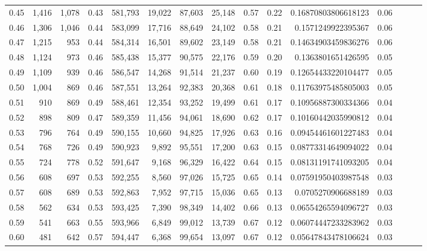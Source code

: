 \begin{tabular}{rrrrrrrrrrrrrrr}
0.45 &   1,416 &  1,078 &  0.43 &  581,793 &   19,022 &   87,603 &   25,148 &  0.57 &  0.22 &     0.16870803806618123 &      0.06 \\
0.46 &   1,306 &  1,046 &  0.44 &  583,099 &   17,716 &   88,649 &   24,102 &  0.58 &  0.21 &      0.1571249922395367 &      0.06 \\
0.47 &   1,215 &    953 &  0.44 &  584,314 &   16,501 &   89,602 &   23,149 &  0.58 &  0.21 &     0.14634903459836276 &      0.06 \\
0.48 &   1,124 &    973 &  0.46 &  585,438 &   15,377 &   90,575 &   22,176 &  0.59 &  0.20 &      0.1363801651426595 &      0.05 \\
0.49 &   1,109 &    939 &  0.46 &  586,547 &   14,268 &   91,514 &   21,237 &  0.60 &  0.19 &     0.12654433220104477 &      0.05 \\
0.50 &   1,004 &    869 &  0.46 &  587,551 &   13,264 &   92,383 &   20,368 &  0.61 &  0.18 &     0.11763975485805003 &      0.05 \\
0.51 &     910 &    869 &  0.49 &  588,461 &   12,354 &   93,252 &   19,499 &  0.61 &  0.17 &     0.10956887300334366 &      0.04 \\
0.52 &     898 &    809 &  0.47 &  589,359 &   11,456 &   94,061 &   18,690 &  0.62 &  0.17 &     0.10160442035990812 &      0.04 \\
0.53 &     796 &    764 &  0.49 &  590,155 &   10,660 &   94,825 &   17,926 &  0.63 &  0.16 &     0.09454461601227483 &      0.04 \\
0.54 &     768 &    726 &  0.49 &  590,923 &    9,892 &   95,551 &   17,200 &  0.63 &  0.15 &     0.08773314649094022 &      0.04 \\
0.55 &     724 &    778 &  0.52 &  591,647 &    9,168 &   96,329 &   16,422 &  0.64 &  0.15 &     0.08131191741093205 &      0.04 \\
0.56 &     608 &    697 &  0.53 &  592,255 &    8,560 &   97,026 &   15,725 &  0.65 &  0.14 &     0.07591950403987548 &      0.03 \\
0.57 &     608 &    689 &  0.53 &  592,863 &    7,952 &   97,715 &   15,036 &  0.65 &  0.13 &      0.0705270906688189 &      0.03 \\
0.58 &     562 &    634 &  0.53 &  593,425 &    7,390 &   98,349 &   14,402 &  0.66 &  0.13 &     0.06554265594096727 &      0.03 \\
0.59 &     541 &    663 &  0.55 &  593,966 &    6,849 &   99,012 &   13,739 &  0.67 &  0.12 &     0.06074447233283962 &      0.03 \\
0.60 &     481 &    642 &  0.57 &  594,447 &    6,368 &   99,654 &   13,097 &  0.67 &  0.12 &     0.05647843478106624 &      0.03 \\

\end{tabular}
